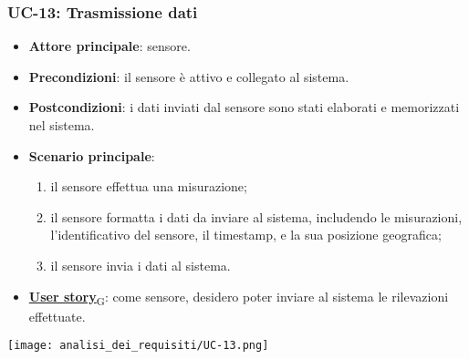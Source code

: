 \subsubsection{UC-13: Trasmissione dati}
\begin{itemize}
	\item \textbf{Attore principale}: sensore.
	\item \textbf{Precondizioni}: il sensore è attivo e collegato al sistema.
	\item \textbf{Postcondizioni}: i dati inviati dal sensore sono stati elaborati e memorizzati nel sistema.
	\item \textbf{Scenario principale}:
	      \begin{enumerate}
		      \item il sensore effettua una misurazione;
		      \item il sensore formatta i dati da inviare al sistema, includendo le misurazioni, l'identificativo del sensore, il timestamp, e la sua posizione geografica;
		      \item il sensore invia i dati al sistema.
	      \end{enumerate}
	\item \href{https://7last.github.io/docs/rtb/documentazione-interna/glossario\#user-story}{\textbf{User story}\textsubscript{G}}: come sensore, desidero poter inviare al sistema le rilevazioni effettuate.
\end{itemize}

\begin{center}
	\texttt{[image: analisi\_dei\_requisiti/UC-13.png]}
\end{center}

